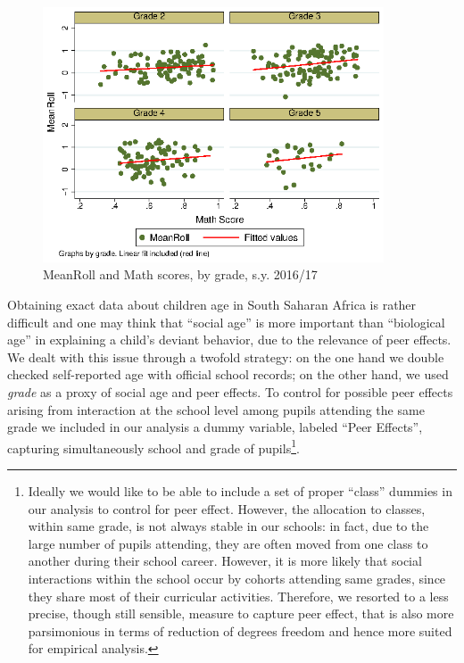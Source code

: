 \documentclass[authoryear, preprint, review, 12pt]{elsarticle}
\begin{document}
\begin{figure}
	\centering
	\includegraphics[width=0.9\textwidth]{figures/cheating_and_math_byclass.eps}
	\caption{\label{fig:summary2}MeanRoll and Math scores, by grade, s.y. 2016/17}
\end{figure}

Obtaining exact data about children age in South Saharan Africa is rather difficult and one may think that \enquote{social age} is more important than \enquote{biological age} in explaining a child's deviant behavior, due to the relevance of peer effects. We dealt with this issue through a twofold strategy: on the one hand we double checked self-reported age with official school records; on the other hand, we used \textit{grade} as a proxy of social age and peer effects. To control for possible peer effects arising from interaction at the school level among pupils attending the same grade we included in our analysis a dummy variable, labeled \enquote{Peer Effects}, capturing simultaneously school and grade of pupils\footnote{Ideally we would like to be able to include a set of proper \enquote{class} dummies in our analysis to control for peer effect. However, the allocation to classes, within same grade, is not always stable in our schools: in fact, due to the large number of pupils attending, they are often moved from one class to another during their school career. However, it is more likely that social interactions within the school occur by cohorts attending same grades, since they share most of their curricular activities. Therefore, we resorted to a less precise, though still sensible, measure to capture peer effect, that is also more parsimonious in terms of reduction of degrees freedom and hence more suited for empirical analysis.}.
\end{document}
